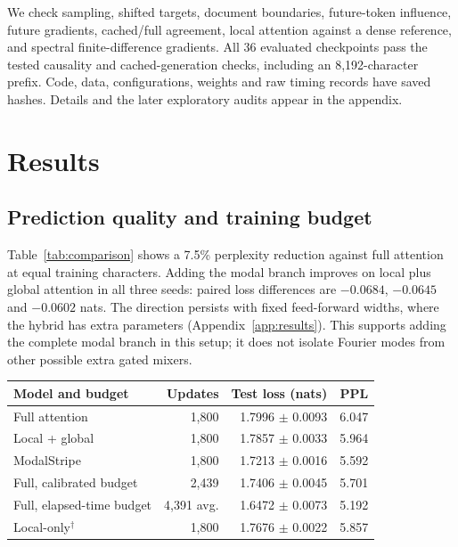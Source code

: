 \documentclass[11pt,letterpaper]{article}
\begin{document}
We check sampling, shifted targets, document boundaries, future-token influence, future gradients, cached/full agreement, local attention against a dense reference, and spectral finite-difference gradients. All 36 evaluated checkpoints pass the tested causality and cached-generation checks, including an 8,192-character prefix. Code, data, configurations, weights and raw timing records have saved hashes. Details and the later exploratory audits appear in the appendix.

\section{Results}
\subsection{Prediction quality and training budget}
Table~\ref{tab:comparison} shows a 7.5\% perplexity reduction against full attention at equal training characters. Adding the modal branch improves on local plus global attention in all three seeds: paired loss differences are $-0.0684$, $-0.0645$ and $-0.0602$ nats. The direction persists with fixed feed-forward widths, where the hybrid has extra parameters (Appendix~\ref{app:results}). This supports adding the complete modal branch in this setup; it does not isolate Fourier modes from other possible extra gated mixers.

\begin{center}\begin{minipage}{\textwidth}\centering\small
{}
\label{tab:comparison}

\begin{tabular}{lrrr}\toprule
Model and budget & Updates & Test loss (nats) & PPL\\\midrule
Full attention & 1,800 & 1.7996 $\pm$ 0.0093 & 6.047 \\
Local + global & 1,800 & 1.7857 $\pm$ 0.0033 & 5.964 \\
ModalStripe & 1,800 & 1.7213 $\pm$ 0.0016 & 5.592 \\
Full, calibrated budget & 2,439 & 1.7406 $\pm$ 0.0045 & 5.701 \\
Full, elapsed-time budget & 4,391 avg. & 1.6472 $\pm$ 0.0073 & 5.192 \\
Local-only$^{\dagger}$ & 1,800 & 1.7676 $\pm$ 0.0022 & 5.857 \\
\bottomrule\end{tabular}


\end{minipage}\end{center}
\end{document}
